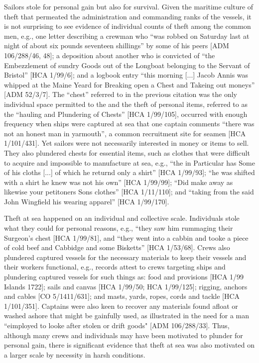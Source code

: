 \largerpage
Sailors stole for personal gain but also for survival. Given the maritime culture of theft that permeated the administration and commanding ranks of the vessels, it is not surprising to see evidence of individual counts of theft among the common men, e.g., one letter describing a crewman who “was robbed on Saturday last at night of about six pounds seventeen shillings” by some of his peers [ADM 106/288/46, 48]; a deposition about another  who is convicted of “the Embezzlement of sundry Goods out of the Longboat belonging to the Servant of Bristol” [HCA 1/99/6]; and a logbook entry “this morning [...] Jacob Annis was whipped at the Maine Yeard for Breaking open a Chest and Takeing out moneys” [ADM 52/3/7]. The “chest” referred to in the previous citation was the only individual space permitted to the  and the theft of personal items, referred to as the “hauling and Plundering of Chests” [HCA 1/99/105], occurred with enough frequency when ships were captured at sea that one captain comments “there was not an honest man in yarmouth”, a common recruitment site for seamen [HCA 1/101/431]. Yet sailors were not necessarily interested in money or items to sell. They also plundered chests for essential items, such as clothes that were difficult to acquire and impossible to manufacture at sea, e.g., “the  in Particular has Some of his cloths [...] of which he returnd only a shirt” [HCA 1/99/93]; “he was shifted with a shirt he knew was not his own” [HCA 1/99/99]; “Did make away as likewise your petitoners Sons clothes” [HCA 1/11/110]; and “taking from the said John Wingfield his wearing apparel” [HCA 1/99/170]. 

Theft at sea happened on an individual and collective scale. Individuals stole what they could for personal reasons, e.g., “they saw him rummaging their Surgeon’s chest [HCA 1/99/81], and “they went into a cabbin and tooke a piece of cold beef and Cabbidge and some Bisketts” [HCA 1/53/68]. Crews also plundered captured vessels for the necessary materials to keep their vessels and their workers functional, e.g., records attest to crews targeting ships and plundering captured vessels for such things as: food and provisions [HCA 1/99  Islands 1722]; sails and canvas [HCA 1/99/50; HCA 1/99/125]; rigging, anchors and cables [CO 5/1411/631]; and masts, yards, ropes, cords and tackle [HCA 1/101/351]. Captains were also keen to recover any materials found afloat or washed ashore that might be gainfully used, as illustrated in the need for a man “eimployed to looke after stolen or drift goods" [ADM 106/288/33]. Thus, although many crews and individuals may have been motivated to plunder for personal gain, there is significant evidence that theft at sea was also motivated on a larger scale by necessity in harsh conditions. 

